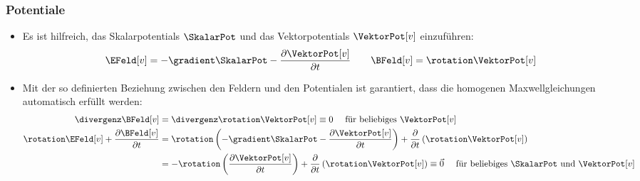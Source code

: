 \begin{frame}
  \frametitle{Potentiale}
  \begin{itemize}[<+->]
  \item Es ist hilfreich, das \alert{Skalarpotentials} $\SkalarPot$ und das \alert{Vektorpotentials} $\VektorPot[v]$ einzuführen:
    \begin{equation}
      \EFeld[v] = -\gradient \SkalarPot - \frac{\partial \VektorPot[v]}{\partial t} \quad\quad \BFeld[v] = \rotation \VektorPot[v]
      \label{eq:PotDef}
    \end{equation}
  \item Mit der so definierten Beziehung zwischen den Feldern und den Potentialen ist garantiert, dass die homogenen Maxwellgleichungen automatisch erfüllt werden:
    \begin{equation}
      \begin{aligned}
        \divergenz\BFeld[v] &= \divergenz\rotation\VektorPot[v] \equiv 0 \quad \text{ für beliebiges } \VektorPot[v] \\
        \rotation \EFeld[v] + \frac{\partial \BFeld[v]}{\partial t} &= \rotation \left( -\gradient \SkalarPot - \frac{\partial \VektorPot[v]}{\partial t} \right) + \frac{\partial}{\partial t} \left( \rotation \VektorPot[v]\right)\\
        &= -\rotation \left( \frac{\partial \VektorPot[v]}{\partial t} \right) + \frac{\partial}{\partial t} \left( \rotation \VektorPot[v]\right) \equiv \vec{0} \quad \text{ für beliebiges } \SkalarPot \text{ und }\VektorPot[v]
        \label{eq:FelderInvariant}
        \end{aligned}
      \end{equation}
    \end{itemize}
    \end{frame}
      
